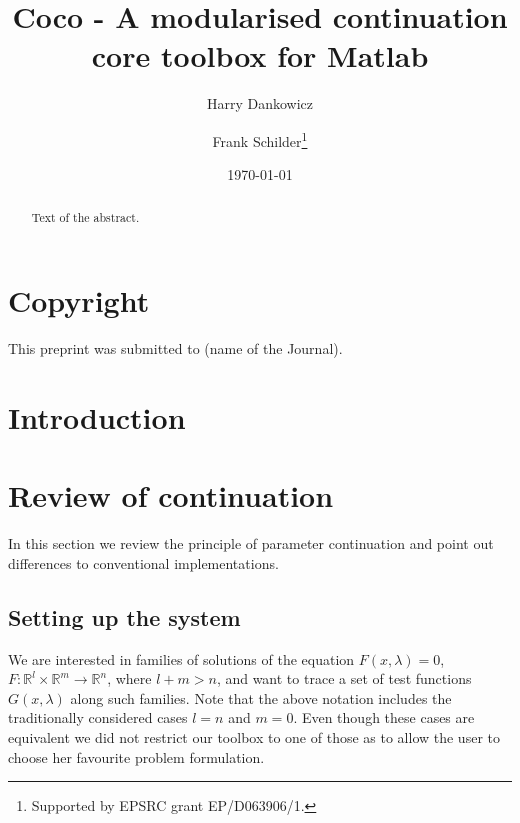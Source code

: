 \documentclass[twoside,draft,a4paper]{article}
\title{\sf Coco - A modularised continuation core toolbox for Matlab}
\author{Harry Dankowicz
\and Frank Schilder\thanks{Supported by EPSRC grant EP/D063906/1.}
}
\date{\today}
\newcommand{\R}{{\mathbb R}}
\begin{document}

\thispagestyle{plain}

\maketitle

\begin{abstract}
Text of the abstract.
\end{abstract}

\vspace{1ex}

\vspace{2ex}

\section*{Copyright}

This preprint was submitted to (name of the Journal).

\tableofcontents


\section{Introduction}

\section{Review of continuation}

In this section we review the principle of parameter continuation and point out differences to conventional implementations.

\subsection{Setting up the system}

We are interested in families of solutions of the equation $F(x,\lambda)=0$, $F:\R^l \times \R^m \to \R^n$, where $l+m>n$, and want to trace a set of test functions $G(x,\lambda)$ along such families. Note that the above notation includes the traditionally considered cases $l=n$ and $m=0$. Even though these cases are equivalent we did not restrict our toolbox to one of those as to allow the user to choose her favourite problem formulation.
\end{document}
